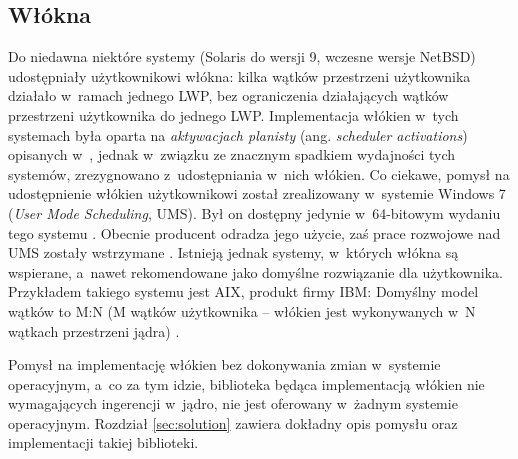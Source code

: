 \documentclass[12pt]{mwart}
\begin{document}
\subsection{Włókna}
\label{sec:fibers}
%
\indent
  Do niedawna niektóre systemy (Solaris do wersji 9, wczesne wersje NetBSD) udostępniały użytkownikowi włókna: kilka wątków przestrzeni użytkownika
  działało w~ramach jednego LWP, bez ograniczenia działających wątków przestrzeni użytkownika do jednego LWP.
  Implementacja włókien w~tych systemach była oparta na \emph{aktywacjach planisty} (ang. \emph{scheduler activations}) opisanych
  w~\cite{hennessy}, jednak
  w~związku ze znacznym spadkiem wydajności tych systemów, zrezygnowano z~udostępniania w~nich włókien.
  Co ciekawe, pomysł na udostępnienie włókien użytkownikowi został zrealizowany w~systemie Windows 7 (\emph{User Mode Scheduling}, UMS). Był on dostępny
  jedynie w~64-bitowym wydaniu tego systemu \cite{umshome}. Obecnie producent odradza jego użycie, zaś prace rozwojowe nad UMS zostały wstrzymane \cite{umscancel}.
  Istnieją jednak systemy, w~których włókna są wspierane, a~nawet rekomendowane jako domyślne rozwiązanie dla użytkownika. Przykładem takiego systemu jest
  AIX, produkt firmy IBM: Domyślny model wątków to M:N (M wątków użytkownika -- włókien jest wykonywanych w~N wątkach przestrzeni jądra) \cite{aixnote}.
\par
%
\indent
  Pomysł na implementację włókien bez dokonywania zmian w~systemie operacyjnym, a~co za tym idzie,
  biblioteka będąca implementacją włókien nie wymagających ingerencji w~jądro, nie jest oferowany w~żadnym systemie operacyjnym.
  Rozdział \ref{sec:solution} zawiera dokładny opis pomysłu oraz implementacji takiej biblioteki.
\par
%
\end{document}
